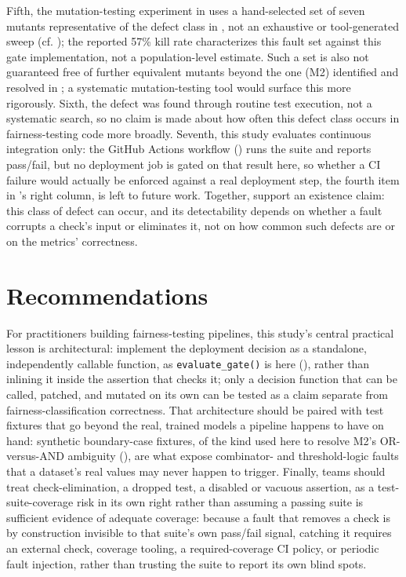 \documentclass[]{einformatica}
\begin{document}
Fifth, the mutation-testing experiment in  uses a hand-selected set of seven mutants representative of the defect class in , not an exhaustive or tool-generated sweep (cf. \cite{Jia2011}); the reported 57\% kill rate characterizes this fault set against this gate implementation, not a population-level estimate. Such a set is also not guaranteed free of further equivalent mutants beyond the one (M2) identified and resolved in ; a systematic mutation-testing tool would surface this more rigorously. Sixth, the  defect was found through routine test execution, not a systematic search, so no claim is made about how often this defect class occurs in fairness-testing code more broadly. Seventh, this study evaluates continuous integration only: the GitHub Actions workflow () runs the suite and reports pass/fail, but no deployment job is gated on that result here, so whether a CI failure would actually be enforced against a real deployment step, the fourth item in 's right column, is left to future work. Together,  support an existence claim: this class of defect can occur, and its detectability depends on whether a fault corrupts a check's input or eliminates it, not on how common such defects are or on the metrics' correctness.

\section{Recommendations}\label{sec:Recommendations}

For practitioners building fairness-testing pipelines, this study's central practical lesson is architectural: implement the deployment decision as a standalone, independently callable function, as \texttt{evaluate\_gate()} is here (), rather than inlining it inside the assertion that checks it; only a decision function that can be called, patched, and mutated on its own can be tested as a claim separate from fairness-classification correctness. That architecture should be paired with test fixtures that go beyond the real, trained models a pipeline happens to have on hand: synthetic boundary-case fixtures, of the kind used here to resolve M2's OR-versus-AND ambiguity (), are what expose combinator- and threshold-logic faults that a dataset's real values may never happen to trigger. Finally, teams should treat check-elimination, a dropped test, a disabled or vacuous assertion, as a test-suite-coverage risk in its own right rather than assuming a passing suite is sufficient evidence of adequate coverage: because a fault that removes a check is by construction invisible to that suite's own pass/fail signal, catching it requires an external check, coverage tooling, a required-coverage CI policy, or periodic fault injection, rather than trusting the suite to report its own blind spots.
\end{document}
